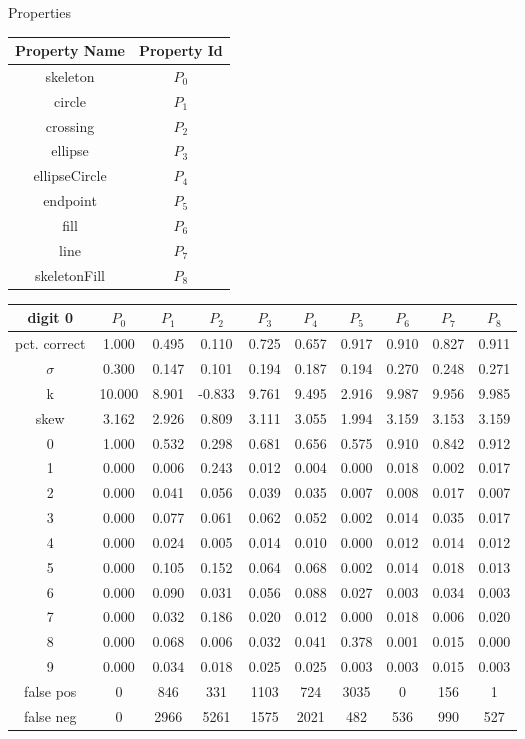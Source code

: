 \documentclass{report}
\begin{document}
Properties

\vspace{1cm}

\begin{tabular}{| c | c |}
 Property Name & Property Id \\
\hline\hline
skeleton & $P_0$ \\
\hline
circle & $P_1$ \\
\hline
crossing & $P_2$ \\
\hline
ellipse & $P_3$ \\
\hline
ellipseCircle & $P_4$ \\
\hline
endpoint & $P_5$ \\
\hline
fill & $P_6$ \\
\hline
line & $P_7$ \\
\hline
skeletonFill & $P_8$ \\
\hline
\end{tabular}

\vspace{1cm}

\begin{tabular}{ | c ||  c | c | c | c | c | c | c | c | c |}
 digit 0 & $P_0$ & $P_1$ & $P_2$ & $P_3$ & $P_4$ & $P_5$ & $P_6$ & $P_7$ & $P_8$ \\
\hline \hline
pct. correct  & 1.000 & 0.495 & 0.110 & 0.725 & 0.657 & 0.917 & 0.910 & 0.827 & 0.911 \\
\hline
$\sigma$ & 0.300& 0.147& 0.101& 0.194& 0.187& 0.194& 0.270& 0.248& 0.271 \\
\hline
k & 10.000& 8.901& -0.833& 9.761& 9.495& 2.916& 9.987& 9.956& 9.985 \\
\hline
skew & 3.162& 2.926& 0.809& 3.111& 3.055& 1.994& 3.159& 3.153& 3.159 \\
\hline
0 & 1.000 & 0.532 & 0.298 & 0.681 & 0.656 & 0.575 & 0.910 & 0.842 & 0.912 \\
\hline
1 & 0.000 & 0.006 & 0.243 & 0.012 & 0.004 & 0.000 & 0.018 & 0.002 & 0.017 \\
\hline
2 & 0.000 & 0.041 & 0.056 & 0.039 & 0.035 & 0.007 & 0.008 & 0.017 & 0.007 \\
\hline
3 & 0.000 & 0.077 & 0.061 & 0.062 & 0.052 & 0.002 & 0.014 & 0.035 & 0.017 \\
\hline
4 & 0.000 & 0.024 & 0.005 & 0.014 & 0.010 & 0.000 & 0.012 & 0.014 & 0.012 \\
\hline
5 & 0.000 & 0.105 & 0.152 & 0.064 & 0.068 & 0.002 & 0.014 & 0.018 & 0.013 \\
\hline
6 & 0.000 & 0.090 & 0.031 & 0.056 & 0.088 & 0.027 & 0.003 & 0.034 & 0.003 \\
\hline
7 & 0.000 & 0.032 & 0.186 & 0.020 & 0.012 & 0.000 & 0.018 & 0.006 & 0.020 \\
\hline
8 & 0.000 & 0.068 & 0.006 & 0.032 & 0.041 & 0.378 & 0.001 & 0.015 & 0.000 \\
\hline
9 & 0.000 & 0.034 & 0.018 & 0.025 & 0.025 & 0.003 & 0.003 & 0.015 & 0.003 \\
\hline
false pos  & 0 & 846 & 331 & 1103 & 724 & 3035 & 0 & 156 & 1 \\
\hline
false neg  & 0 & 2966 & 5261 & 1575 & 2021 & 482 & 536 & 990 & 527 \\
\hline
\end{tabular}
\end{document}
